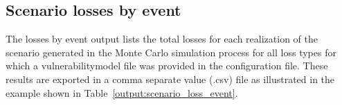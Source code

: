 


\subsection{Scenario losses by event}
\label{subsec:scenario_losses_event}

The losses by event output lists the total losses for each realization of the
scenario generated in the Monte Carlo simulation process for all loss types
for which a \gls{vulnerabilitymodel} file was provided in the configuration
file. These results are exported in a comma separate value (.csv) file as
illustrated in the example shown in Table~\ref{output:scenario_loss_event}.




